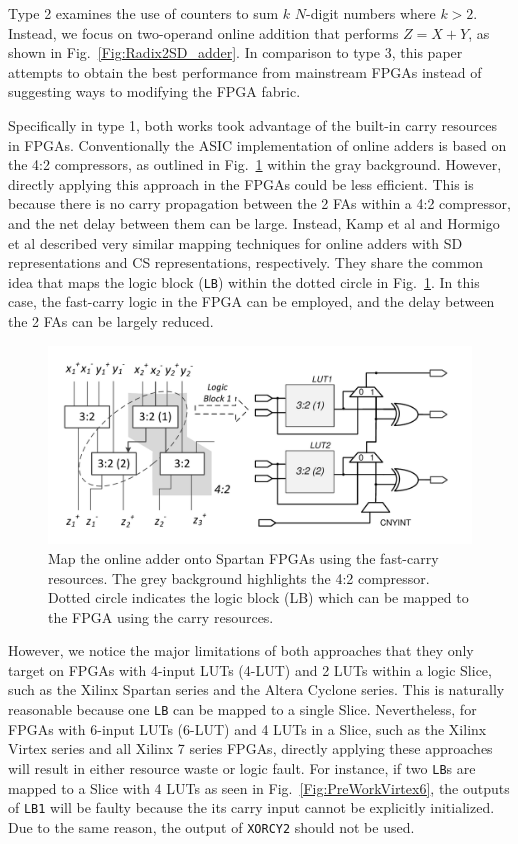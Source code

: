 \documentclass[conference]{IEEEtran}
\begin{document}
Type 2 examines the use of counters to sum $k$ $N$-digit numbers where $k>2$. Instead, we focus on two-operand online addition that performs $Z=X+Y$, as shown in Fig.~\ref{Fig:Radix2SD_adder}. In comparison to type 3, this paper attempts to obtain the best performance from mainstream FPGAs instead of suggesting ways to modifying the FPGA fabric.

Specifically in type 1, both works took advantage of the built-in carry resources in FPGAs. Conventionally the ASIC implementation of online adders is based on the 4:2 compressors, as outlined in Fig.~\ref{Fig:PreviousWork} within the gray background. However, directly applying this approach in the FPGAs could be less efficient. This is because there is no carry propagation between the 2 FAs within a 4:2 compressor, and the net delay between them can be large. Instead, Kamp et al \cite{FPT09RA} and Hormigo et al \cite{ASAP09RA} described very similar mapping techniques for online adders with SD representations and CS representations, respectively. They share the common idea that maps the logic block (\texttt{LB}) within the dotted circle in Fig.~\ref{Fig:PreviousWork}. In this case, the fast-carry logic in the FPGA can be employed, and the delay between the 2 FAs can be largely reduced.

\begin{figure}[tbp]
	\centering
	\includegraphics[width=.5\textwidth]{./Figures/SDAdder_42comp_Spartan2.pdf}
	\caption{Map the online adder onto Spartan FPGAs using the fast-carry resources. The grey background highlights the 4:2 compressor. Dotted circle indicates the logic block (LB) which can be mapped to the FPGA using the carry resources.}
	\label{Fig:PreviousWork}
\end{figure}

However, we notice the major limitations of both approaches that they only target on FPGAs with 4-input LUTs (4-LUT) and 2 LUTs within a logic Slice, such as the Xilinx Spartan series and the Altera Cyclone series. This is naturally reasonable because one \texttt{LB} can be mapped to a single Slice. Nevertheless, for FPGAs with 6-input LUTs (6-LUT) and 4 LUTs in a Slice, such as the Xilinx Virtex series and all Xilinx 7 series FPGAs, directly applying these approaches will result in either resource waste or logic fault. For instance, if two \texttt{LB}s are mapped to a Slice with 4 LUTs as seen in Fig.~\ref{Fig:PreWorkVirtex6}, the outputs of \texttt{LB1} will be faulty because the its carry input cannot be explicitly initialized. Due to the same reason, the output of \texttt{XORCY2} should not be used.
\end{document}
